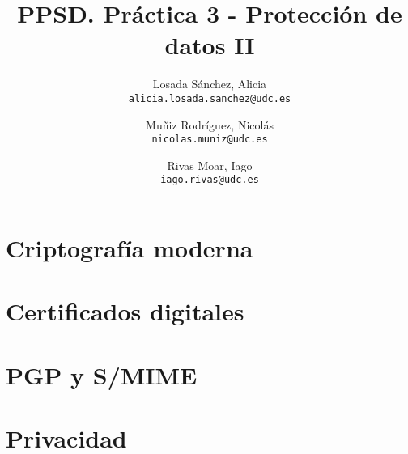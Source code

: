 \documentclass[a4paper, titlepage]{article}
\title{PPSD. Práctica 3 - Protección de datos II}
\author{
    Losada Sánchez, Alicia\\
    \texttt{alicia.losada.sanchez@udc.es}
    \and
    Muñiz Rodríguez, Nicolás\\
    \texttt{nicolas.muniz@udc.es}
    \and
    Rivas Moar, Iago\\
    \texttt{iago.rivas@udc.es}
}
\begin{document}
\maketitle

\section{Criptografía moderna}





\section{Certificados digitales}



\section{PGP y S/MIME}







\section{Privacidad}






\end{document}
